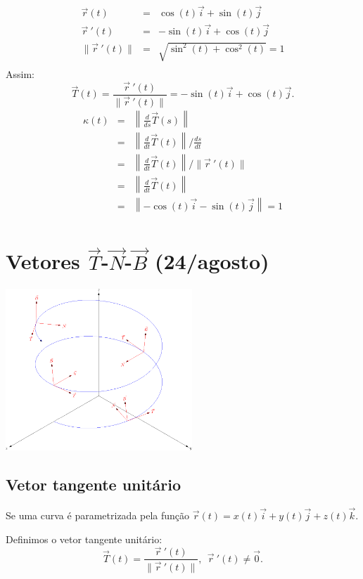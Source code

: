 \documentclass[a4paper,10pt]{article}
\begin{document}
\begin{eqnarray*}
\vec{r}(t)&=&\cos(t)\vec{i}+\sin(t)\vec{j} \\
\vec{r}~\!'(t)&=&-\sin(t)\vec{i}+\cos(t)\vec{j} \\
\|\vec{r}~\!'(t)\|&=&\sqrt{\sin^2(t)+\cos^2(t)}=1 \\
\end{eqnarray*}
Assim:
$$\vec{T}(t) = \frac{\vec{r}~\!'(t)}{\|\vec{r}~\!'(t)\|}=-\sin(t)\vec{i}+\cos(t)\vec{j}.$$
\begin{eqnarray*}
\kappa(t) &=& \left\|\frac{d}{ds}\vec{T}(s)\right\|\\
&=&\left\|\frac{d}{dt}\vec{T}(t)\right\|/ \frac{ds}{dt}\\
&=&\left\|\frac{d}{dt}\vec{T}(t)\right\|/ \|\vec{r}~\!'(t)\|\\
&=&\left\|\frac{d}{dt}\vec{T}(t)\right\|\\
&=&\left\|-\cos(t)\vec{i}-\sin(t)\vec{j}\right\|=1\\
\end{eqnarray*}



\section{Vetores $\vec{T}$-$\vec{N}$-$\vec{B}$ (24/agosto)}
\begin{center}
 \includegraphics[width=7cm]{figs/helice_TNB.png}
 \end{center}

 \subsection{Vetor tangente unitário}
 Se uma curva é parametrizada pela função $\vec{r}(t)=x(t)\vec{i}+y(t)\vec{j}+z(t)\vec{k}$.
 
 Definimos o vetor tangente unitário:
 $$\vec{T}(t) = \frac{\vec{r}~\!'(t)}{\|\vec{r}~\!'(t)\|},~~\vec{r}~\!'(t)\neq \vec{0}.$$
\end{document}
